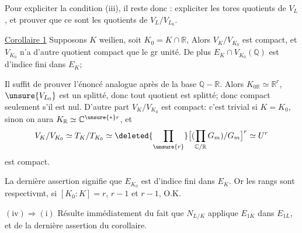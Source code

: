 Pour expliciter la condition (iii), il reste donc : expliciter les tores
quotients  de  $V_L$, et
prouver que ce sont les quotients de $V_L/V_{L_0}$.



\uline{Corollaire 1} Supposons $K$ weilien, soit $K_0=K\cap\mathbb R$,
 Alors $V_K/V_{K_0}$ est compact, et $V_{K_0}$ n'a d'autre
 quotient compact que le gr unité.
De plus $E_K\cap V_{K_0}(\mathbb Q)$ est d'indice fini dans $E_K$;

Il suffit  de prouver l'énoncé analogue
après  de la base $\mathbb Q-\mathbb R$.
Alors $K_{0\mathbb R}\simeq\mathbb R^r$, 
$\unsure{V_{L_0}}$ est un  splitté, donc tout quotient est splitté;
donc compact seulement s'il est  nul.
D'autre part $V_K/V_{K_0}$ est compact: c'est trivial si $K=K_0$,
sinon on aura $K_{\mathbb R}\simeq\mathbb C^{\unsure{*}r}$, et
\[
V_K/V_{K_0}\simeq T_K/T_{K_0}\simeq
\deleted{\prod_{\unsure{r}}}
\bigl[(\prod_{\mathbb C/\mathbb R}G_m)/G_m\bigr]^r\simeq U^r
\]
est compact.

La dernière assertion signifie  que $E_{K_0}$ est d'indice
fini dans $E_K$. Or les rangs sont respectivmt, si $[K_0:K]=r$,
$r-1$ et $r-1$, O.K.

$(\mathrm{iv})\Longrightarrow(\mathrm{i})$ Résulte immédiatement du fait que
$N_{L/K}$ applique $E_{1K}$ dans $E_{1L}$, et de la dernière
assertion du corollaire.
